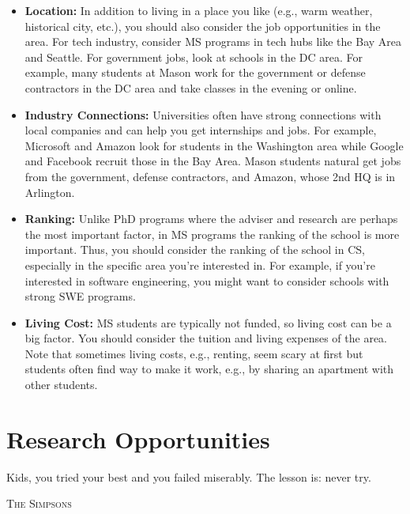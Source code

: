\documentclass[oneside,11pt,dvipsnames]{book}
\def\chapterinfo#1{%
  \addcontentsline{toc}{chapterinfo}{%
    \noexpand\numberline{}\color{black}{#1}}%
}
\begin{document}
\begin{itemize}

\item \textbf{Location:} In addition to living in a place you like (e.g., warm weather, historical city, etc.), you should also consider the job opportunities in the area.  For tech industry, consider MS programs in tech hubs like the Bay Area and Seattle. For government jobs, look at schools in the DC area.  For example, many students at Mason work for the government or defense contractors in the DC area and take classes in the evening or online.

\item \textbf{Industry Connections:} Universities often have strong connections with local companies and can help you get internships and jobs. For example, Microsoft and Amazon look for students in the Washington area while  Google and Facebook recruit those in the Bay Area.  Mason students natural get jobs from the government, defense contractors, and Amazon, whose 2nd HQ is in Arlington.

\item \textbf{Ranking:} Unlike PhD programs where the adviser and research are perhaps the most important factor, in MS programs the ranking of the school is more important.  Thus, you should consider the ranking of the school in CS, especially in the specific area you're interested in.  For example, if you're interested in software engineering, you might want to consider schools with strong SWE programs. 

\item \textbf{Living Cost:} MS students are typically not funded, so living cost can be a big factor. You should consider the tuition and living expenses of the area. Note that sometimes living costs, e.g., renting, seem scary at first but students often find way to make it work, e.g., by sharing an apartment with other students.

\end{itemize}


\chapter{Research Opportunities}\label{sec:research-opportunities}
\chapterinfo{How to get research experience as an undergrad.}

\epigraph{\vspace{-0.2in} Kids, you tried your best and you failed miserably. The lesson is: never try.}{\textsc{The Simpsons}}
\end{document}
